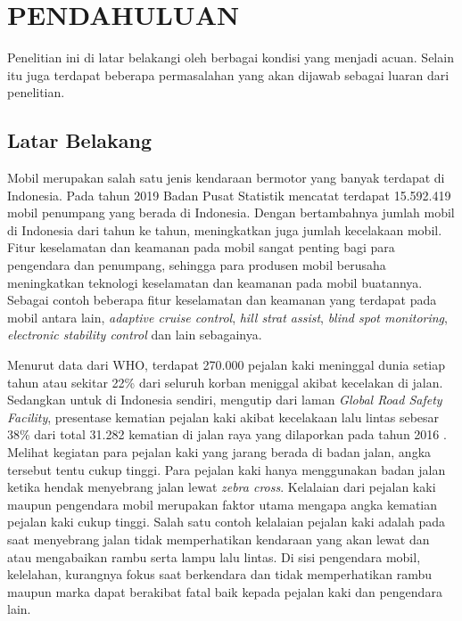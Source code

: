 \chapter{PENDAHULUAN}
\label{chap:pendahuluan}


Penelitian ini di latar belakangi oleh berbagai kondisi yang menjadi acuan. Selain itu juga terdapat beberapa permasalahan yang akan dijawab sebagai luaran dari penelitian.

\section{Latar Belakang}
\label{sec:latarbelakang}

Mobil merupakan salah satu jenis kendaraan bermotor yang banyak terdapat di Indonesia. Pada tahun 2019 Badan Pusat Statistik mencatat terdapat 15.592.419 mobil penumpang yang berada di Indonesia. Dengan bertambahnya jumlah mobil di Indonesia dari tahun ke tahun, meningkatkan juga jumlah kecelakaan mobil. Fitur keselamatan dan keamanan pada mobil sangat penting bagi para pengendara dan penumpang, sehingga para produsen mobil berusaha meningkatkan teknologi keselamatan dan keamanan pada mobil buatannya. Sebagai contoh beberapa fitur keselamatan dan keamanan yang terdapat pada mobil antara lain, \textit{adaptive cruise control}, \textit{hill strat assist}, \textit{blind spot monitoring}, \textit{electronic stability control} dan lain sebagainya.

Menurut data dari WHO, terdapat 270.000 pejalan kaki meninggal dunia setiap tahun atau sekitar 22\% dari seluruh korban meniggal akibat kecelakan di jalan\cite{who}. Sedangkan untuk di Indonesia sendiri, mengutip dari laman \textit{Global Road Safety Facility}, presentase kematian pejalan kaki akibat kecelakaan lalu lintas sebesar 38\% dari total 31.282 kematian di jalan raya yang dilaporkan pada tahun 2016 \cite{grsf}. Melihat kegiatan para pejalan kaki yang jarang berada di badan jalan, angka tersebut tentu cukup tinggi. Para pejalan kaki hanya menggunakan badan jalan ketika hendak menyebrang jalan lewat \textit{zebra cross}. Kelalaian dari pejalan kaki maupun pengendara mobil merupakan faktor utama mengapa angka kematian pejalan kaki cukup tinggi. Salah satu contoh kelalaian pejalan kaki adalah pada saat menyebrang jalan tidak memperhatikan kendaraan yang akan lewat dan atau mengabaikan rambu serta lampu lalu lintas. Di sisi pengendara mobil, kelelahan, kurangnya fokus saat berkendara dan tidak memperhatikan rambu maupun marka dapat berakibat fatal baik kepada pejalan kaki dan pengendara lain.

